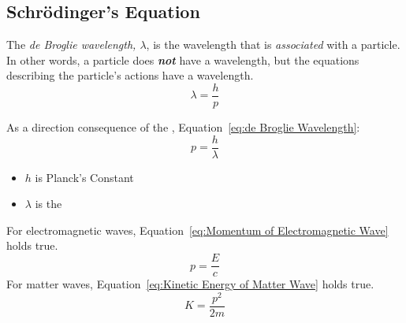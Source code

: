 \subsection{Schr\"{o}dinger's Equation}\label{subsec:Schrodingers Equation}
\begin{definition}\label{def:de Broglie Wavelength}
  The \emph{de Broglie wavelength, $\lambda$}, is the wavelength that is \emph{associated} with a particle.
  In other words, a particle does \emph{\textbf{not}} have a wavelength, but the equations describing the particle's actions have a wavelength.
  \begin{equation}\label{eq:de Broglie Wavelength}
    \lambda = \frac{h}{p}
  \end{equation}
  \begin{note}\label{note:de Broglie Wavelength Momentum}
    As a direction consequence of the , Equation~\eqref{eq:de Broglie Wavelength}:
    \begin{equation}
      p = \frac{h}{\lambda}
    \end{equation}
    \begin{itemize}[noitemsep, nolistsep]
    \item $h$ is Planck's Constant
    \item $\lambda$ is the 
    \end{itemize}
    For electromagnetic waves, Equation~\eqref{eq:Momentum of Electromagnetic Wave} holds true.
    \begin{equation}\label{eq:Momentum of Electromagnetic Wave}
      p = \frac{E}{c}
    \end{equation}
    For matter waves, Equation~\eqref{eq:Kinetic Energy of Matter Wave} holds true.
    \begin{equation}\label{eq:Kinetic Energy of Matter Wave}
      K = \frac{p^{2}}{2m}
    \end{equation}
  \end{note}
\end{definition}

